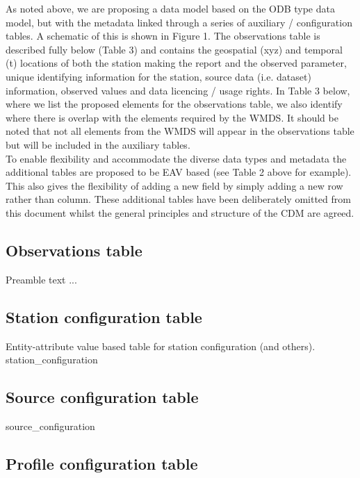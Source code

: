 \documentclass[a4paper]{article}
\begin{document}
As noted above, we are proposing a data model based on the ODB type data model, but with the metadata linked through a series of auxiliary / configuration tables. A schematic of this is shown in Figure 1. The observations table is described fully below (Table 3) and contains the geospatial (xyz) and temporal (t) locations of both the station making the report and the observed parameter, unique identifying information for the station, source data (i.e. dataset) information, observed values and data licencing / usage rights. In Table 3 below, where we list the proposed elements for the observations table, we also identify where there is overlap with the elements required by the WMDS. It should be noted that not all elements from the WMDS will appear in the observations table but will be included in the auxiliary tables. \\

To enable flexibility and accommodate the diverse data types and metadata the additional tables are proposed to be EAV based (see Table 2 above for example). This also gives the flexibility of adding a new field by simply adding a new row rather than column. These additional tables have been deliberately omitted from this document whilst the general principles and structure of the CDM are agreed.

%

\subsection {Observations table}

Preamble text ... \\



\subsection {Station configuration table}

Entity-attribute value based table for station configuration (and others).
 {station_configuration}


\subsection {Source configuration table}

 {source_configuration}

\subsection {Profile configuration table}
\end{document}
